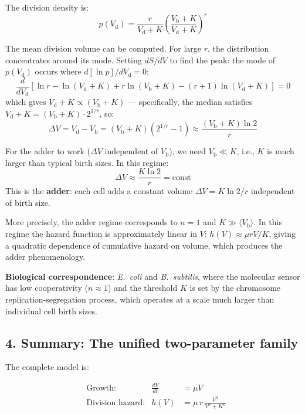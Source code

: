 \documentclass[11pt]{article}
\newcommand{\Vb}{V_{\mathrm{b}}}
\newcommand{\Vd}{V_{\mathrm{d}}}
\newcommand{\DV}{\Delta V}
\begin{document}
The division density is:
\begin{equation}
  p(\Vd) = \frac{r}{\Vd + K}\left(\frac{\Vb + K}{\Vd + K}\right)^r
\end{equation}

The mean division volume can be computed. For large $r$, the distribution
concentrates around its mode. Setting $dS/dV$ to find the peak:
the mode of $p(\Vd)$ occurs where $d[\ln p]/d\Vd = 0$:
\begin{equation}
  \frac{d}{d\Vd}\left[\ln r - \ln(\Vd+K) + r\ln(\Vb+K) - (r+1)\ln(\Vd+K)\right] = 0
\end{equation}
which gives $\Vd + K \propto (\Vb + K)$ --- specifically, the median satisfies
$\Vd + K = (\Vb + K) \cdot 2^{1/r}$, so:
\begin{equation}
  \DV = \Vd - \Vb = (\Vb + K)(2^{1/r} - 1) \approx \frac{(\Vb + K) \ln 2}{r}
\end{equation}

For the adder to work ($\DV$ independent of $\Vb$), we need $\Vb \ll K$, i.e.,
$K$ is much larger than typical birth sizes. In this regime:
\begin{equation}
  \DV \approx \frac{K \ln 2}{r} = \text{const}
  \label{eq:adder_approx}
\end{equation}
This is the \textbf{adder}: each cell adds a constant volume $\DV = K\ln 2 / r$
independent of birth size.

More precisely, the adder regime corresponds to $n = 1$ and $K \gg \langle \Vb \rangle$.
In this regime the hazard function is approximately linear in $V$:
$h(V) \approx \mu r V / K$, giving a quadratic dependence of cumulative hazard
on volume, which produces the adder phenomenology.

\textbf{Biological correspondence}: \textit{E.~coli} and \textit{B.~subtilis},
where the molecular sensor has low cooperativity ($n \approx 1$) and the
threshold $K$ is set by the chromosome replication-segregation process, which
operates at a scale much larger than individual cell birth sizes.

\subsection*{4. Summary: The unified two-parameter family}

The complete model is:

\begin{equation}
  \boxed{
  \begin{aligned}
    &\text{Growth:} & \frac{dV}{dt} &= \mu V \\[6pt]
    &\text{Division hazard:} & h(V) &= \mu \, r \, \frac{V^n}{V^n + K^n}
  \end{aligned}
  }
  \label{eq:unified}
\end{equation}
\end{document}
